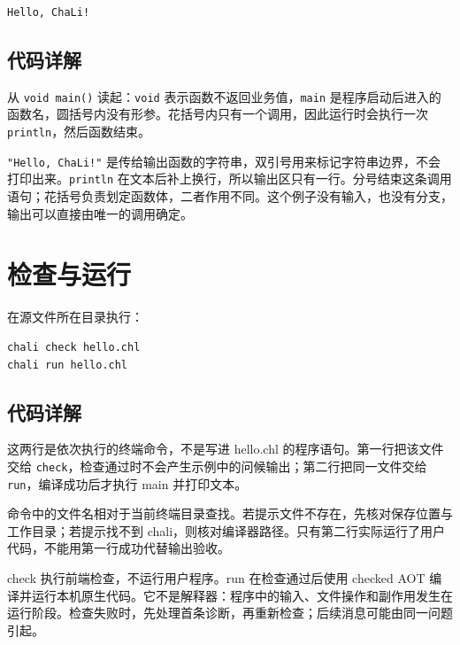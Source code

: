 \par
\medskip
\begin{lstlisting}[style=out]
Hello, ChaLi!
\end{lstlisting}
\par
\medskip

\subsection*{代码详解}

从 \texttt{void main(\allowbreak{})\allowbreak{}} 读起：\texttt{void} 表示函数不返回业务值，\texttt{main} 是程序启动后进入的函数名，圆括号内没有形参。花括号内只有一个调用，因此运行时会执行一次 \texttt{println}，然后函数结束。

\texttt{"Hello,\allowbreak{} Cha\allowbreak{}Li!"} 是传给输出函数的字符串，双引号用来标记字符串边界，不会打印出来。\texttt{println} 在文本后补上换行，所以输出区只有一行。分号结束这条调用语句；花括号负责划定函数体，二者作用不同。这个例子没有输入，也没有分支，输出可以直接由唯一的调用确定。

\section{检查与运行}

在源文件所在目录执行：

\par
\medskip
\begin{lstlisting}[style=sh]
chali check hello.chl
chali run hello.chl
\end{lstlisting}
\par
\medskip

\subsection*{代码详解}

这两行是依次执行的终端命令，不是写进 hello.chl 的程序语句。第一行把该文件交给 \texttt{check}，检查通过时不会产生示例中的问候输出；第二行把同一文件交给 \texttt{run}，编译成功后才执行 main 并打印文本。

命令中的文件名相对于当前终端目录查找。若提示文件不存在，先核对保存位置与工作目录；若提示找不到 chali，则核对编译器路径。只有第二行实际运行了用户代码，不能用第一行成功代替输出验收。

check 执行前端检查，不运行用户程序。run 在检查通过后使用 checked AOT 编译并运行本机原生代码。它不是解释器：程序中的输入、文件操作和副作用发生在运行阶段。检查失败时，先处理首条诊断，再重新检查；后续消息可能由同一问题引起。

